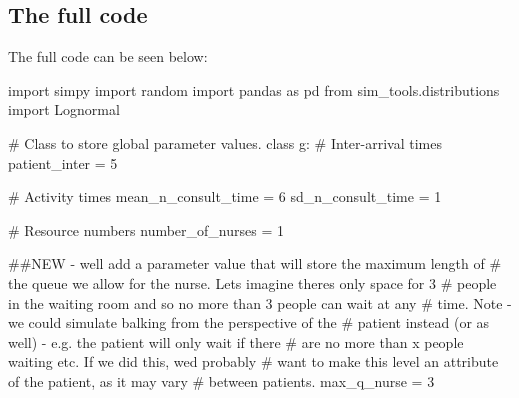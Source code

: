 \documentclass[
  letterpaper,
  DIV=11,
  numbers=noendperiod]{scrreprt}
\newenvironment{Shaded}{}{}
\newcommand{\CommentTok}[1]{\textcolor[rgb]{0.42,0.45,0.49}{#1}}
\newcommand{\DecValTok}[1]{\textcolor[rgb]{0.00,0.36,0.77}{#1}}
\newcommand{\ImportTok}[1]{\textcolor[rgb]{0.01,0.18,0.38}{#1}}
\newcommand{\KeywordTok}[1]{\textcolor[rgb]{0.84,0.23,0.29}{#1}}
\newcommand{\NormalTok}[1]{\textcolor[rgb]{0.14,0.16,0.18}{#1}}
\newcommand{\OperatorTok}[1]{\textcolor[rgb]{0.14,0.16,0.18}{#1}}
\begin{document}
\subsection{The full code}\label{the-full-code-5}

The full code can be seen below:

\begin{tcolorbox}[enhanced jigsaw, colframe=quarto-callout-note-color-frame, bottomtitle=1mm, breakable, rightrule=.15mm, coltitle=black, colbacktitle=quarto-callout-note-color!10!white, opacityback=0, leftrule=.75mm, arc=.35mm, toptitle=1mm, title=\textcolor{quarto-callout-note-color}{\faInfo}\hspace{0.5em}{Click here to view the full code}, titlerule=0mm, colback=white, toprule=.15mm, bottomrule=.15mm, left=2mm, opacitybacktitle=0.6]

\begin{Shaded}
\begin{Highlighting}[]
\ImportTok{import}\NormalTok{ simpy}
\ImportTok{import}\NormalTok{ random}
\ImportTok{import}\NormalTok{ pandas }\ImportTok{as}\NormalTok{ pd}
\ImportTok{from}\NormalTok{ sim\_tools.distributions }\ImportTok{import}\NormalTok{ Lognormal}

\CommentTok{\# Class to store global parameter values.}
\KeywordTok{class}\NormalTok{ g:}
    \CommentTok{\# Inter{-}arrival times}
\NormalTok{    patient\_inter }\OperatorTok{=} \DecValTok{5}

    \CommentTok{\# Activity times}
\NormalTok{    mean\_n\_consult\_time }\OperatorTok{=} \DecValTok{6}
\NormalTok{    sd\_n\_consult\_time }\OperatorTok{=} \DecValTok{1}

    \CommentTok{\# Resource numbers}
\NormalTok{    number\_of\_nurses }\OperatorTok{=} \DecValTok{1}

    \CommentTok{\#\#NEW {-} we\textquotesingle{}ll add a parameter value that will store the maximum length of}
    \CommentTok{\# the queue we allow for the nurse.  Let\textquotesingle{}s imagine there\textquotesingle{}s only space for 3}
    \CommentTok{\# people in the waiting room and so no more than 3 people can wait at any}
    \CommentTok{\# time.  Note {-} we could simulate balking from the perspective of the}
    \CommentTok{\# patient instead (or as well) {-} e.g. the patient will only wait if there}
    \CommentTok{\# are no more than x people waiting etc.  If we did this, we\textquotesingle{}d probably}
    \CommentTok{\# want to make this level an attribute of the patient, as it may vary}
    \CommentTok{\# between patients.}
\NormalTok{    max\_q\_nurse }\OperatorTok{=} \DecValTok{3}


\end{Highlighting}
\end{Shaded}
\end{tcolorbox}
\end{document}
